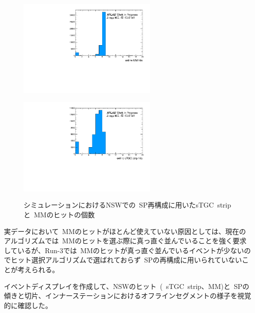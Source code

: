 \begin{figure}[H]
  \begin{minipage}[b]{0.48\linewidth}
      \centering
      \includegraphics[clip, width=6.8cm]{fig/5/MC_onlinemm.pdf}
      \label{fig:5-9-1}
  \end{minipage}
    \begin{minipage}[b]{0.48\linewidth}
      \centering
      \includegraphics[clip, width=6.8cm]{fig/5/MC_onlinestgceta.pdf}
      \label{fig:5-9-2}
  \end{minipage}
  \caption{シミュレーションにおけるNSWでの~SP再構成に用いたsTGC~stripと~MMのヒットの個数}\label{fig:5-9}
\end{figure}


実データにおいて~MMのヒットがほとんど使えていない原因としては、現在のアルゴリズムでは~MMのヒットを選ぶ際に真っ直ぐ並んでいることを強く要求しているが、Run-3では~MMのヒットが真っ直ぐ並んでいるイベントが少ないのでヒット選択アルゴリズムで選ばれておらず~SPの再構成に用いられていないことが考えられる。

イベントディスプレイを作成して、NSWのヒット~(~sTGC~strip、MM)と~SPの傾きと切片、インナーステーションにおけるオフラインセグメントの様子を視覚的に確認した。

